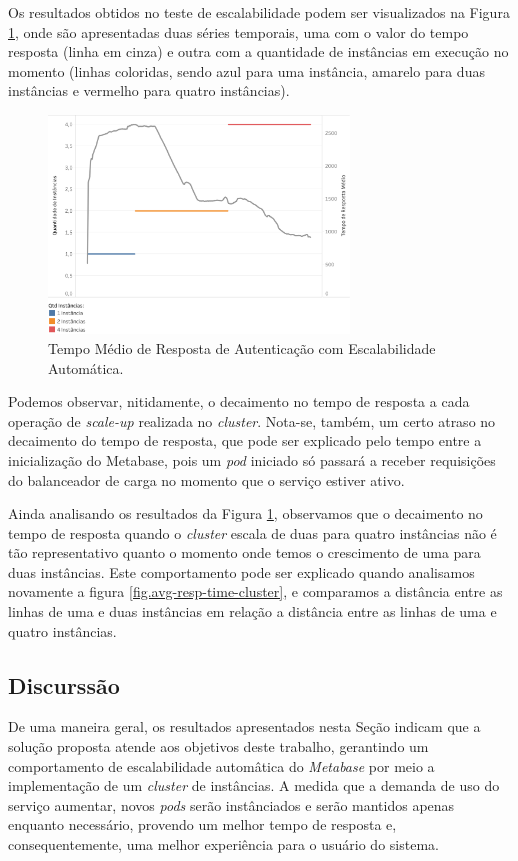 Os resultados obtidos no teste de escalabilidade podem ser visualizados na Figura \ref{fig.avg-resp-time-hpa}, onde são apresentadas duas séries temporais, uma com o valor do tempo resposta (linha em cinza) e outra com a quantidade de instâncias em execução no momento (linhas coloridas, sendo azul para uma instância, amarelo para duas instâncias e vermelho para quatro instâncias).

\begin{figure}[htp]
   \centering
    \includegraphics[width=8cm]{Imagens/Performance-HPA}
    \caption{Tempo Médio de Resposta de Autenticação com Escalabilidade Automática.}
    \label{fig.avg-resp-time-hpa}
\end{figure} 

Podemos observar, nitidamente, o decaimento no tempo de resposta a cada operação de \textit{scale-up} realizada no \textit{cluster}. Nota-se, também, um certo atraso no decaimento do tempo de resposta, que pode ser explicado pelo tempo entre a inicialização do Metabase, pois um \textit{pod} iniciado só passará a receber requisições do balanceador de carga no momento que o serviço estiver ativo.

Ainda analisando os resultados da Figura \ref{fig.avg-resp-time-hpa}, observamos que o decaimento no tempo de resposta quando o \textit{cluster} escala de duas para quatro instâncias não é tão representativo quanto o momento onde temos o crescimento de uma para duas instâncias. Este comportamento pode ser explicado quando analisamos novamente a figura \ref{fig.avg-resp-time-cluster}, e comparamos a distância entre as linhas de uma e duas instâncias em relação a distância entre as linhas de uma e quatro instâncias.


\subsection{Discurssão}

De uma maneira geral, os resultados apresentados nesta Seção indicam que a solução proposta atende aos objetivos deste trabalho, gerantindo um comportamento de escalabilidade automâtica do \textit{Metabase} por meio a implementação de um \textit{cluster} de instâncias. A medida que a demanda de uso do serviço aumentar, novos \textit{pods} serão instânciados e serão mantidos apenas enquanto necessário, provendo um melhor tempo de resposta e, consequentemente, uma melhor experiência para o usuário do sistema. 

